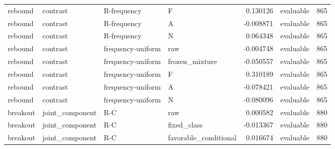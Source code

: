 \begin{longtable}{llllrlr}
rebound & contrast & R-frequency & F & 0.130126 & evaluable & 865 \\
rebound & contrast & R-frequency & A & -0.008871 & evaluable & 865 \\
rebound & contrast & R-frequency & N & 0.064348 & evaluable & 865 \\
rebound & contrast & frequency-uniform & raw & -0.004748 & evaluable & 865 \\
rebound & contrast & frequency-uniform & frozen\_mixture & -0.050557 & evaluable & 865 \\
rebound & contrast & frequency-uniform & F & 0.310189 & evaluable & 865 \\
rebound & contrast & frequency-uniform & A & -0.078421 & evaluable & 865 \\
rebound & contrast & frequency-uniform & N & -0.080096 & evaluable & 865 \\
breakout & joint\_component & R-C & raw & 0.000582 & evaluable & 880 \\
breakout & joint\_component & R-C & fixed\_class & -0.013367 & evaluable & 880 \\
breakout & joint\_component & R-C & favorable\_conditional & 0.016674 & evaluable & 880 \\
\end{longtable}
